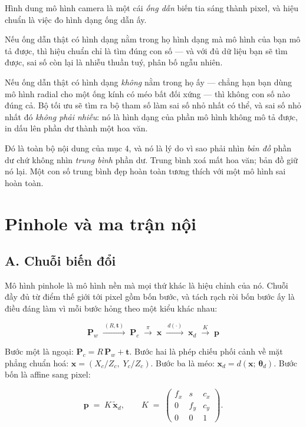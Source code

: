 \documentclass[../../vslam.tex]{subfiles}
\begin{document}
\begin{trucgiac}
Hình dung mô hình camera là một cái \emph{ống dẫn} biến tia sáng thành pixel, và hiệu chuẩn là việc đo hình dạng ống dẫn ấy.

Nếu ống dẫn thật có hình dạng nằm trong họ hình dạng mà mô hình của bạn mô tả được, thì hiệu chuẩn chỉ là tìm đúng con số --- và với đủ dữ liệu bạn sẽ tìm được, sai số còn lại là nhiễu thuần tuý, phân bố ngẫu nhiên.

Nếu ống dẫn thật có hình dạng \emph{không} nằm trong họ ấy --- chẳng hạn bạn dùng mô hình radial cho một ống kính có méo bất đối xứng --- thì không con số nào đúng cả. Bộ tối ưu sẽ tìm ra bộ tham số làm sai số nhỏ nhất có thể, và sai số nhỏ nhất đó \emph{không phải nhiễu}: nó là hình dạng của phần mô hình không mô tả được, in dấu lên phần dư thành một hoa văn.

Đó là toàn bộ nội dung của mục 4, và nó là lý do vì sao phải nhìn \emph{bản đồ} phần dư chứ không nhìn \emph{trung bình} phần dư. Trung bình xoá mất hoa văn; bản đồ giữ nó lại. Một con số trung bình đẹp hoàn toàn tương thích với một mô hình sai hoàn toàn.
\end{trucgiac}

\section{Pinhole và ma trận nội}

\subsection{A. Chuỗi biến đổi}

Mô hình pinhole là mô hình nền mà mọi thứ khác là hiệu chỉnh của nó. Chuỗi đầy đủ từ điểm thế giới tới pixel gồm bốn bước, và tách rạch ròi bốn bước ấy là điều đáng làm vì mỗi bước hỏng theo một kiểu khác nhau:

\[
\mathbf{P}_w
\;\xrightarrow{\ (R,\mathbf{t})\ }\;
\mathbf{P}_c
\;\xrightarrow{\ \pi\ }\;
\mathbf{x}
\;\xrightarrow{\ d(\cdot)\ }\;
\mathbf{x}_d
\;\xrightarrow{\ K\ }\;
\mathbf{p}
\]

Bước một là ngoại: \(\mathbf{P}_c = R\,\mathbf{P}_w + \mathbf{t}\). Bước hai là phép chiếu phối cảnh về mặt phẳng chuẩn hoá: \(\mathbf{x} = (X_c/Z_c,\; Y_c/Z_c)\). Bước ba là méo: \(\mathbf{x}_d = d(\mathbf{x};\, \boldsymbol{\theta}_d)\). Bước bốn là affine sang pixel:

\[
\mathbf{p} \;=\; K\,\tilde{\mathbf{x}}_d,
\qquad
K \;=\; \begin{pmatrix} f_x & s & c_x \\ 0 & f_y & c_y \\ 0 & 0 & 1\end{pmatrix} .
\]
\end{document}
